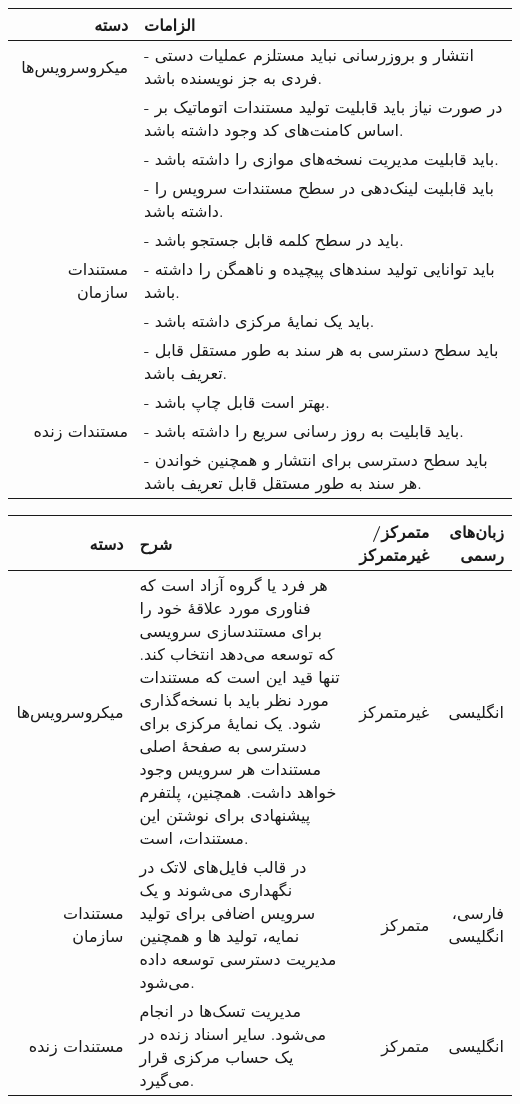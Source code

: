 \documentclass{cake-classes/short-report-fa}
\begin{document}
\begin{table}[hp]
    \vspace{0.5cm}
	\centering
	\begin{tabular}{rp{10cm}}
\toprule
دسته & الزامات \\
\midrule
{}{API} میکروسرویس‌ها & - انتشار و بروزرسانی نباید مستلزم عملیات دستی فردی به جز نویسنده باشد. \\
& - در صورت نیاز باید قابلیت تولید مستندات اتوماتیک بر اساس کامنت‌های کد وجود داشته باشد. \\
&  - باید قابلیت مدیریت نسخه‌های موازی را داشته باشد. \\
&  - باید قابلیت لینک‌دهی در سطح مستندات سرویس را داشته باشد. \\
&  - باید در سطح کلمه قابل جستجو باشد. \\
\hline
مستندات سازمان &  - باید توانایی تولید سندهای پیچیده و ناهمگن را داشته باشد. \\
&  - باید یک نمایهٔ مرکزی داشته باشد. \\
&  - باید سطح دسترسی به هر سند به طور مستقل قابل تعریف باشد. \\
&  - بهتر است قابل چاپ باشد. \\
\hline
مستندات زنده &  - باید قابلیت به روز رسانی سریع را داشته باشد. \\
&  - باید سطح دسترسی برای انتشار و همچنین خواندن هر سند به طور مستقل قابل تعریف باشد. \\
\bottomrule
	\end{tabular}
\end{table}

\begin{table}[hp]
	\vspace{0.5cm}
	\centering
	\begin{tabular}{rp{6cm}rr}
		\toprule
		دسته & شرح & متمرکز/غیرمتمرکز & زبان‌های رسمی \\
		\midrule
{}{API} میکروسرویس‌ها & هر فرد یا گروه آزاد است که فناوری مورد علاقهٔ خود را برای مستندسازی {API} سرویسی که توسعه می‌دهد انتخاب کند. تنها قید این است که مستندات مورد نظر باید با {git} نسخه‌گذاری شود. یک نمایهٔ مرکزی برای دسترسی به صفحهٔ اصلی مستندات هر سرویس وجود خواهد داشت. همچنین، پلتفرم پیشنهادی برای نوشتن این مستندات، {sphinx} است. & غیرمتمرکز & انگلیسی \\
		\hline
مستندات سازمان & در قالب فایل‌های لاتک در {git} نگهداری می‌شوند و یک سرویس اضافی برای تولید نمایه، تولید {pdf}ها و همچنین مدیریت دسترسی توسعه داده می‌شود. & متمرکز & فارسی، انگلیسی \\
		\hline
مستندات زنده & مدیریت تسک‌ها در {Trello} انجام می‌شود. سایر اسناد زنده در یک حساب {Google Docs} مرکزی قرار می‌گیرد. & متمرکز & انگلیسی \\
		\bottomrule
	\end{tabular}
\end{table}
\end{document}
